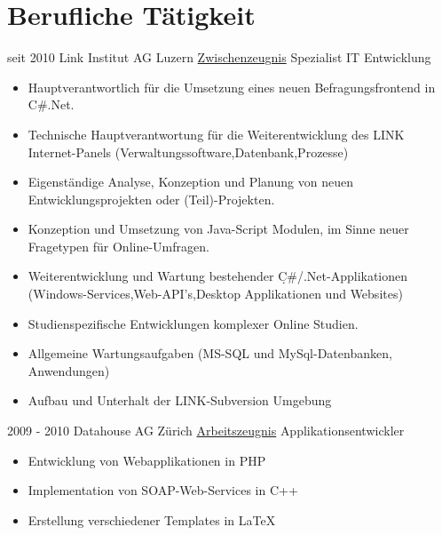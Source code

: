 \documentclass[a4paper]{twentysecondcv} %
\begin{document}
    

    \makeprofile %
    \hypertarget{work_back}{}
    \section{Berufliche Tätigkeit}
    \begin{twenty}
        \twentyitem
        {seit 2010}
        {}
        {Link Institut AG \textnormal{Luzern}}
        {\hyperlink{link}{\textcolor{pblue}{Zwischenzeugnis}}}
        {Spezialist IT Entwicklung}
        {\begin{itemize}
             \item Hauptverantwortlich für die Umsetzung eines neuen Befragungsfrontend in C\#.Net.
             \item Technische Hauptverantwortung für die Weiterentwicklung des LINK Internet-Panels
             (Verwaltungssoftware,Datenbank,Prozesse)
             \item Eigenständige Analyse, Konzeption und Planung von neuen Entwicklungsprojekten oder (Teil)-Projekten.
             \item Konzeption und Umsetzung von Java-Script Modulen, im Sinne neuer Fragetypen für Online-Umfragen.
             \item Weiterentwicklung und Wartung bestehender C̣\#/.Net-Applikationen (Windows-Services,Web-API's,Desktop Applikationen und Websites)
             \item Studienspezifische Entwicklungen komplexer Online Studien.
             \item Allgemeine Wartungsaufgaben (MS-SQL und MySql-Datenbanken, Anwendungen)
             \item Aufbau und Unterhalt der LINK-Subversion Umgebung
        \end{itemize}}
        \twentyitem
        {}
        {}
        {}
        {}
        {}
        {}
        \twentyitem
        {2009 - 2010}
        {}
        {Datahouse AG \textnormal{Zürich}}
        {\hyperlink{datahouse}{\textcolor{pblue}{Arbeitszeugnis}}}
        {Applikationsentwickler}
        {
        \begin{itemize}
            \item Entwicklung von Webapplikationen in PHP
            \item Implementation von SOAP-Web-Services in C++
            \item Erstellung verschiedener Templates in \LaTeX
        \end{itemize}
}
\end{twenty}
\end{document}
